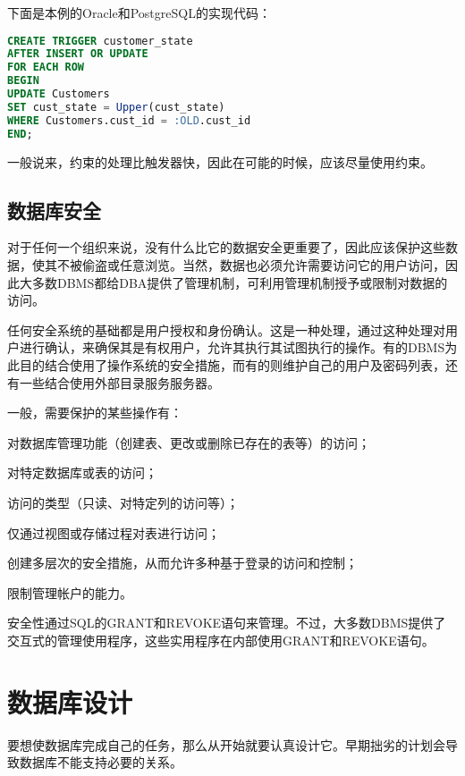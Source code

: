 下面是本例的Oracle和PostgreSQL的实现代码：

\begin{lstlisting}[language=SQL]
CREATE TRIGGER customer_state
AFTER INSERT OR UPDATE
FOR EACH ROW
BEGIN
UPDATE Customers
SET cust_state = Upper(cust_state)
WHERE Customers.cust_id = :OLD.cust_id
END;
\end{lstlisting}



一般说来，约束的处理比触发器快，因此在可能的时候，应该尽量使用约束。

\subsection{数据库安全}

对于任何一个组织来说，没有什么比它的数据安全更重要了，因此应该保护这些数据，使其不被偷盗或任意浏览。当然，数据也必须允许需要访问它的用户访问，因此大多数DBMS都给DBA提供了管理机制，可利用管理机制授予或限制对数据的访问。

任何安全系统的基础都是用户授权和身份确认。这是一种处理，通过这种处理对用户进行确认，来确保其是有权用户，允许其执行其试图执行的操作。有的DBMS为此目的结合使用了操作系统的安全措施，而有的则维护自己的用户及密码列表，还有一些结合使用外部目录服务服务器。

一般，需要保护的某些操作有：

\begin{compactitem}
\item 对数据库管理功能（创建表、更改或删除已存在的表等）的访问；
\item 对特定数据库或表的访问；
\item 访问的类型（只读、对特定列的访问等）；
\item 仅通过视图或存储过程对表进行访问；
\item 创建多层次的安全措施，从而允许多种基于登录的访问和控制；
\item 限制管理帐户的能力。
\end{compactitem}

安全性通过SQL的GRANT和REVOKE语句来管理。不过，大多数DBMS提供了交互式的管理使用程序，这些实用程序在内部使用GRANT和REVOKE语句。






\section{数据库设计}

要想使数据库完成自己的任务，那么从开始就要认真设计它。早期拙劣的计划会导致数据库不能支持必要的关系。

